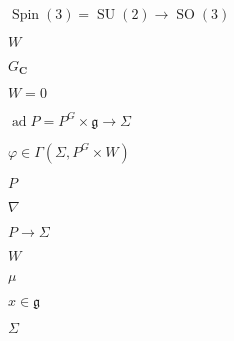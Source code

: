 \begin{preview}
\setcounter{equation}{0}%
\( \operatorname{Spin}(3) = \operatorname{SU}(2) \to \operatorname{SO}(3) \)
\end{preview}

\begin{preview}
\setcounter{equation}{0}%
\( W \)
\end{preview}

\begin{preview}
\setcounter{equation}{0}%
\( G_{\mathbf{C}} \)
\end{preview}

\begin{preview}
\setcounter{equation}{0}%
\( W=0 \)
\end{preview}

\begin{preview}
\setcounter{equation}{0}%
\( \operatorname{ad}P = P^G \times \mathfrak{g}\to \Sigma \)
\end{preview}

\begin{preview}
\setcounter{equation}{0}%
\( \varphi \in \Gamma(\Sigma , P^G \times W) \)
\end{preview}

\begin{preview}
\setcounter{equation}{0}%
\( P \)
\end{preview}

\begin{preview}
\setcounter{equation}{0}%
\( \nabla \)
\end{preview}

\begin{preview}
\setcounter{equation}{0}%
\( P \to \Sigma \)
\end{preview}

\begin{preview}
\setcounter{equation}{0}%
\( W \)
\end{preview}

\begin{preview}
\setcounter{equation}{0}%
\( \mu \)
\end{preview}

\begin{preview}
\setcounter{equation}{0}%
\( x\in \mathfrak{g} \)
\end{preview}

\begin{preview}
\setcounter{equation}{0}%
\( \Sigma \)
\end{preview}

